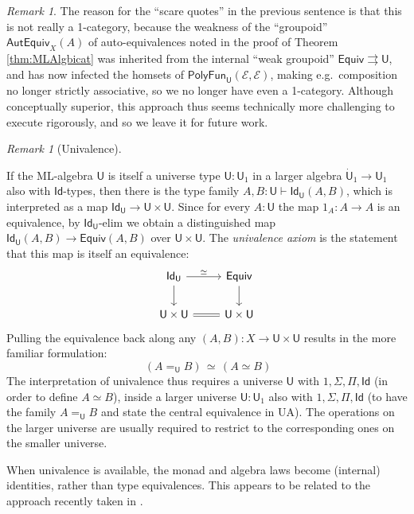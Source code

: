 \documentclass[12pt,reqno]{amsart}
\newcommand{\EE}{\ensuremath{\mathcal{E}}}
\renewcommand{\to}{\ensuremath{\rightarrow}}
\newcommand{\tto}{\ensuremath{\rightrightarrows}}
\newcommand{\Id}{\mathsf{Id}}
\newcommand{\T}{\ensuremath{\mathsf{U}}}
\newcommand{\TT}{\ensuremath{\dot{\mathsf{U}}}}
\theoremstyle{remark}
\newtheorem{remark}[theorem]{Remark}
\theoremstyle{definition}
\begin{document}
\begin{remark}
The reason for the ``scare quotes'' in the previous sentence is that this is not really a 1-category, because the weakness of the ``groupoid'' $\mathsf{AutEquiv}_X(A)$ of auto-equivalences noted in the proof of Theorem \ref{thm:MLAlgbicat} was inherited from the internal ``weak groupoid''  $\mathsf{Equiv} \tto \T$, and has now infected the homsets of $\mathsf{PolyFun}_\T(\EE, \EE)$, making e.g.\ composition no longer strictly associative, so we no longer have even a 1-category.  Although conceptually superior, this approach thus seems technically more challenging to execute rigorously, and so we leave it for future work.
\end{remark}

\begin{remark}[Univalence]\label{remark:univalence}

If the ML-algebra $\T$ is itself a universe type $\T : \T_1$ in a larger algebra $\TT_1 \to \T_1$ also with $\Id{}$-types, then there is the type family $A, B: \T \vdash \Id_{\T}(A,B)$, which is interpreted as a map $\Id_{\T}\to \T \times \T$.  Since for every $A:\T$ the map $1_A : A \to A$ is an equivalence, by $\Id_{\T}$-elim we obtain a distinguished map  $\Id_{\T}(A, B) \to \mathsf{Equiv}(A, B)$ over $\T \times \T$.  The \emph{univalence axiom} is the statement that this map is itself an equivalence:
\begin{equation}\label{diag:univalence4}
\begin{tikzcd} 
\Id_{\T} \ar[d] \ar[r, "{\simeq}"] & \mathsf{Equiv} \ar[d] \\  
 \T \times \T  \ar[r, equals] & \T \times \T
	 \end{tikzcd}
 \end{equation}
 Pulling the equivalence back along any $(A, B) : X \to \T \times \T$ results in the more familiar formulation:
 \[\tag{UA}
 \ (A =_\T B) \, \simeq\, (A \simeq B)
 \]
The interpretation of univalence thus requires a universe $\T$ with $1, \Sigma, \Pi, \Id{}$ (in order to define $A\simeq B$), inside a larger universe $\T:\T_1$ also with $1, \Sigma, \Pi, \Id{}$ (to have the family $A =_\T B$ and state the central equivalence in UA). The operations on the larger universe are usually required to restrict to the corresponding ones on the smaller universe.  

When univalence is available, the monad and algebra laws become (internal) identities, rather than type equivalences.  This appears to be related to the approach recently taken in \cite{AberleSpivak:2024}.
\end{remark}
\end{document}
